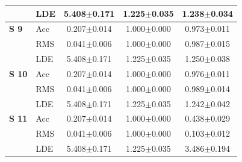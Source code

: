 \begin{tabular}{llccc}
 & LDE & 5.408$\pm$0.171 & 1.225$\pm$0.035 & 1.238$\pm$0.034 \\
\hline
\textbf{S 9} & Acc & 0.207$\pm$0.014 & 1.000$\pm$0.000 & 0.973$\pm$0.011 \\
 & RMS & 0.041$\pm$0.006 & 1.000$\pm$0.000 & 0.987$\pm$0.015 \\
 & LDE & 5.408$\pm$0.171 & 1.225$\pm$0.035 & 1.250$\pm$0.038 \\
\hline
\textbf{S 10} & Acc & 0.207$\pm$0.014 & 1.000$\pm$0.000 & 0.976$\pm$0.011 \\
 & RMS & 0.041$\pm$0.006 & 1.000$\pm$0.000 & 0.989$\pm$0.014 \\
 & LDE & 5.408$\pm$0.171 & 1.225$\pm$0.035 & 1.242$\pm$0.042 \\
\hline
\textbf{S 11} & Acc & 0.207$\pm$0.014 & 1.000$\pm$0.000 & 0.438$\pm$0.029 \\
 & RMS & 0.041$\pm$0.006 & 1.000$\pm$0.000 & 0.103$\pm$0.012 \\
 & LDE & 5.408$\pm$0.171 & 1.225$\pm$0.035 & 3.486$\pm$0.194 \\
\hline
\end{tabular}
